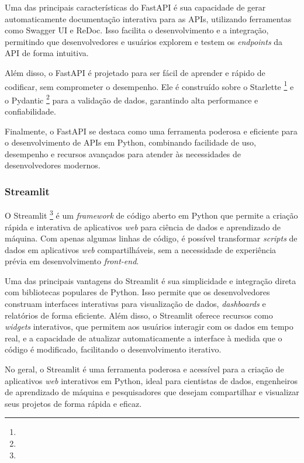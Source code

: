 \documentclass[a4paper, 12pt]{article}
\begin{document}
    Uma das principais características do FastAPI é sua capacidade de gerar automaticamente documentação interativa para as APIs, utilizando ferramentas como Swagger UI e ReDoc. Isso facilita o desenvolvimento e a integração, permitindo que desenvolvedores e usuários explorem e testem os \textit{endpoints} da API de forma intuitiva.

    Além disso, o FastAPI é projetado para ser fácil de aprender e rápido de codificar, sem comprometer o desempenho. Ele é construído sobre o Starlette \footnote{} e o Pydantic \footnote{} para a validação de dados, garantindo alta performance e confiabilidade.

    Finalmente, o FastAPI se destaca como uma ferramenta poderosa e eficiente para o desenvolvimento de APIs em Python, combinando facilidade de uso, desempenho e recursos avançados para atender às necessidades de desenvolvedores modernos.

    \subsubsection{Streamlit} \label{sec:streamlit}
    
    O Streamlit \footnote{} é um \textit{framework} de código aberto em Python que permite a criação rápida e interativa de aplicativos \textit{web} para ciência de dados e aprendizado de máquina. Com apenas algumas linhas de código, é possível transformar \textit{scripts} de dados em aplicativos \textit{web} compartilháveis, sem a necessidade de experiência prévia em desenvolvimento \textit{front-end}.

    Uma das principais vantagens do Streamlit é sua simplicidade e integração direta com bibliotecas populares de Python. Isso permite que os desenvolvedores construam interfaces interativas para visualização de dados, \textit{dashboards} e relatórios de forma eficiente. Além disso, o Streamlit oferece recursos como \textit{widgets} interativos, que permitem aos usuários interagir com os dados em tempo real, e a capacidade de atualizar automaticamente a interface à medida que o código é modificado, facilitando o desenvolvimento iterativo.

    No geral, o Streamlit é uma ferramenta poderosa e acessível para a criação de aplicativos \textit{web} interativos em Python, ideal para cientistas de dados, engenheiros de aprendizado de máquina e pesquisadores que desejam compartilhar e visualizar seus projetos de forma rápida e eficaz.
\end{document}
